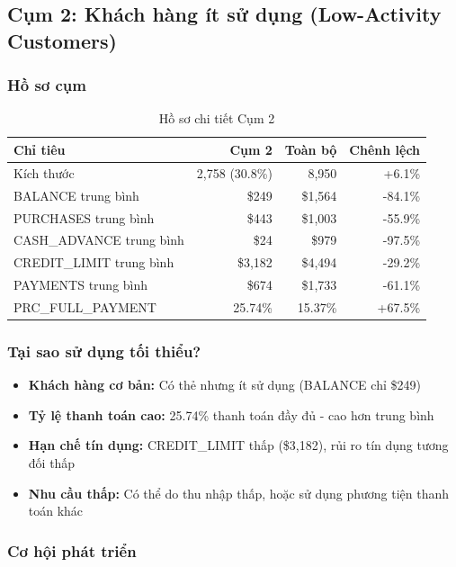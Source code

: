 \subsection{Cụm 2: Khách hàng ít sử dụng (Low-Activity Customers)}

\subsubsection{Hồ sơ cụm}

\begin{table}[H]
\centering
\caption{Hồ sơ chi tiết Cụm 2}
\begin{tabular}{|l|r|r|r|}
\hline
\textbf{Chỉ tiêu} & \textbf{Cụm 2} & \textbf{Toàn bộ} & \textbf{Chênh lệch} \\
\hline
Kích thước & 2,758 (30.8\%) & 8,950 & +6.1\% \\
\hline
BALANCE trung bình & \$249 & \$1,564 & -84.1\% \\
\hline
PURCHASES trung bình & \$443 & \$1,003 & -55.9\% \\
\hline
CASH\_ADVANCE trung bình & \$24 & \$979 & -97.5\% \\
\hline
CREDIT\_LIMIT trung bình & \$3,182 & \$4,494 & -29.2\% \\
\hline
PAYMENTS trung bình & \$674 & \$1,733 & -61.1\% \\
\hline
PRC\_FULL\_PAYMENT & 25.74\% & 15.37\% & +67.5\% \\
\hline
\end{tabular}
\end{table}

\subsubsection{Tại sao sử dụng tối thiểu?}

\begin{itemize}
    \item \textbf{Khách hàng cơ bản:} Có thẻ nhưng ít sử dụng (BALANCE chỉ \$249)
    \item \textbf{Tỷ lệ thanh toán cao:} 25.74\% thanh toán đầy đủ - cao hơn trung bình
    \item \textbf{Hạn chế tín dụng:} CREDIT\_LIMIT thấp (\$3,182), rủi ro tín dụng tương đối thấp
    \item \textbf{Nhu cầu thấp:} Có thể do thu nhập thấp, hoặc sử dụng phương tiện thanh toán khác
\end{itemize}

\subsubsection{Cơ hội phát triển}

